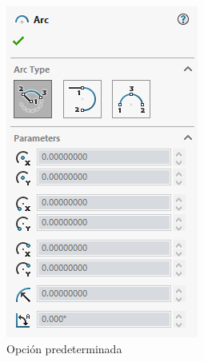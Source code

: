 \documentclass{report}
\begin{document}
\begin{figure}[H]
	\centering
	\begin{subfigure}[b]{0.45\textwidth}
		\includegraphics[width=\textwidth]{Imagenes/solidworks_ciclarcona01}
		\caption{Opción predeterminada}
		\label{fig:solidworksciclarcona01}
	\end{subfigure}
	\begin{subfigure}[b]{0.45\textwidth}

\end{subfigure}
\end{figure}
\end{document}

